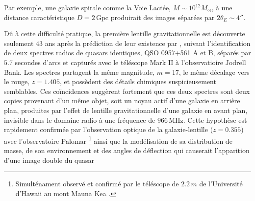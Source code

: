 Par exemple, une galaxie spirale comme la Voie Lactée, $M\sim 10^{12} M_{\odot}$, à une distance caractéristique $D= 2\, \mathrm{Gpc}$ produirait des 
images séparées par $2 \theta_E \sim 4''$. 

Dû à cette difficulté pratique, 
la première lentille gravitationnelle est découverte seulement $43$ ans après la prédiction de leur existence par \citet{Walsh1979}, 
suivant l'identification de deux spectres radios de quasars identiques, QSO 0957+561 A et B, séparés par $5.7$ secondes d'arcs
et capturés avec le téléscope Mark II à l'observatioire Jodrell Bank. 
Les spectres partagent la même magnitude, $m=17$, le même décalage vers le rouge, $z=1.405$, et possèdent des détails 
chimiques suspicieusement semblables. Ces coïncidences suggèrent fortement que ces deux spectres sont deux copies provenant d'un même objet, soit un noyau 
actif d'une galaxie en arrière plan, produites par l'effet de lentille gravitationnelle d'une galaxie en avant plan, invisible dans le 
domaine radio à une fréquence de $966\,\mathrm{MHz}$. Cette hypothèse est rapidement confirmée par 
l'observation optique de la galaxie-lentille ($z=0.355$) avec l'observatoire Palomar \citep{Young1980}\footnote{Simulténament 
observé et confirmé par le téléscope de $2.2\, m$ de l'Université d'Hawaii au mont Mauna Kea \citep{Stockton1980}.} 
ainsi que la modélisation de sa distribution de masse, de son environnement 
et des angles de déflection qui causerait l'apparition d'une image double du quasar \citep{Young1981,Falco1991}

